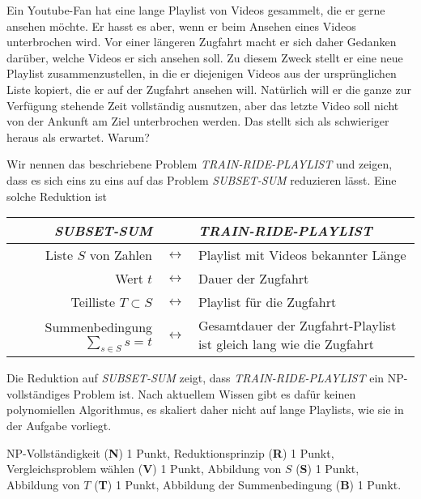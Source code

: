 Ein Youtube-Fan hat eine lange Playlist von Videos gesammelt, die er
gerne ansehen möchte.
Er hasst es aber, wenn er beim Ansehen eines Videos unterbrochen wird.
Vor einer längeren Zugfahrt macht er sich daher Gedanken darüber,
welche Videos er sich ansehen soll.
Zu diesem Zweck stellt er eine neue Playlist zusammenzustellen,
in die er diejenigen Videos aus der ursprünglichen Liste kopiert,
die er auf der Zugfahrt ansehen will.
Natürlich will er die ganze zur Verfügung stehende Zeit vollständig
ausnutzen, aber das letzte Video soll nicht von der Ankunft am Ziel
unterbrochen werden.
Das stellt sich als schwieriger heraus als erwartet. Warum?


\begin{loesung}
Wir nennen das beschriebene Problem {\em TRAIN-RIDE-PLAYLIST} und 
zeigen, dass es sich eins zu eins auf das Problem {\em SUBSET-SUM}
reduzieren lässt.
Eine solche Reduktion ist
\begin{center}
\renewcommand{\arraystretch}{1.3}
\begin{tabular}{r>{$}c<{$}p{8cm}}
{\em SUBSET-SUM}&&{\em TRAIN-RIDE-PLAYLIST}\\
\hline
Liste $S$ von Zahlen
&\leftrightarrow&
Playlist mit Videos bekannter Länge
\\
Wert $t$
&\leftrightarrow&
Dauer der Zugfahrt
\\
Teilliste $T\subset S$
&\leftrightarrow&
Playlist für die Zugfahrt
\\
Summenbedingung $\displaystyle\sum_{s\in S} s = t$
&\leftrightarrow&
Gesamtdauer der Zugfahrt-Playlist ist gleich lang wie die Zugfahrt
\end{tabular}
\end{center}
Die Reduktion auf {\em SUBSET-SUM} zeigt, dass {\em TRAIN-RIDE-PLAYLIST}
ein NP-vollständiges Problem ist.
Nach aktuellem Wissen gibt es dafür keinen polynomiellen Algorithmus,
es skaliert daher nicht auf lange Playlists, wie sie in der Aufgabe
vorliegt.
\end{loesung}

\begin{bewertung}
NP-Vollständigkeit ({\bf N}) 1 Punkt,
Reduktionsprinzip ({\bf R}) 1 Punkt,
Vergleichsproblem wählen ({\bf V}) 1 Punkt,
Abbildung von $S$ ({\bf S}) 1 Punkt,
Abbildung von $T$ ({\bf T}) 1 Punkt,
Abbildung der Summenbedingung ({\bf B}) 1 Punkt.
\end{bewertung}


